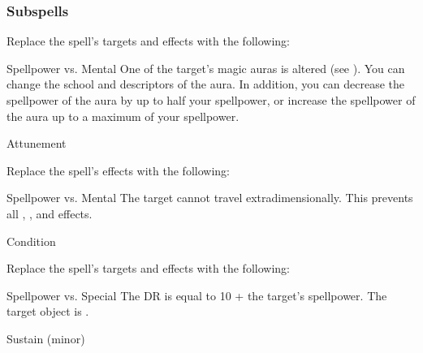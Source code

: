 \subsubsection{Subspells}
Replace the spell's targets and effects with the following:
\begin{spellcontent}
\begin{augmenttargetinginfo}
\end{augmenttargetinginfo}
\begin{augmenteffects}
\begin{spellattack}{Spellpower vs. Mental}
\spellsuccess
One of the target's magic auras is altered (see ).
You can change the school and descriptors of the aura.
In addition, you can decrease the spellpower of the aura by up to half your spellpower, or increase the spellpower of the aura up to a maximum of your spellpower.
\end{spellattack}
\spelldur Attunement
\end{augmenteffects}
\end{spellcontent}
Replace the spell's effects with the following:
\begin{spellcontent}
\begin{augmenteffects}
\begin{spellattack}{Spellpower vs. Mental}
\spellsuccess
The target cannot travel extradimensionally.
This prevents all , , and  effects.
\end{spellattack}
\spelldur Condition
\end{augmenteffects}
\end{spellcontent}
Replace the spell's targets and effects with the following:
\begin{spellcontent}
\begin{augmenttargetinginfo}
\end{augmenttargetinginfo}
\begin{augmenteffects}
\begin{spellattack}{Spellpower vs. Special}
\spellspecial
The DR is equal to 10 + the target's spellpower.
\spellsuccess
The target object is .
\end{spellattack}
\spelldur Sustain (minor)
\end{augmenteffects}
\end{spellcontent}
